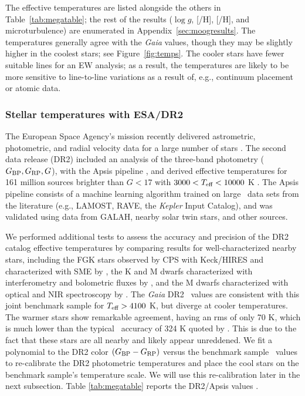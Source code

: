 The \moog effective temperatures are listed alongside the others in Table~\ref{tab:megatable}; the rest of the \moog results ($\log g$, [/H], [/H], and microturbulence) are enumerated in Appendix~\ref{sec:moogresults}.  The temperatures generally agree with the {\it Gaia} values, though they may be slightly higher in the coolest stars; see Figure~\ref{fig:temps}.  The cooler stars have fewer suitable  lines for an EW analysis; as a result, the temperatures are likely to be more sensitive to line-to-line variations as a result of, e.g., continuum placement or atomic data.


\subsubsection{Stellar temperatures with ESA/\gaia DR2} 
\label{sec:dr2}
The European Space Agency's \gaia mission recently delivered 
astrometric, photometric, and radial velocity data for 
a large number of stars \citep{GaiaDR2}. 
The second data release (DR2) included an analysis of the three-band photometry ($G_{\rm BP}, G_{\rm RP}, G$), 
with the Apsis pipeline \citep{apsis2013}, 
and derived effective temperatures for 161 million sources brighter than $G<17$ 
with $3000 < T_{\mbox{\scriptsize eff}} < 10000$ K \citep{DR2prop}. 
The Apsis pipeline consists of a machine learning algorithm trained on 
large \teff\ data sets from the literature (e.g., LAMOST, RAVE, the \textit{Kepler} Input Catalog), 
and was validated using 
data from GALAH, nearby solar twin stars, and other sources.

We performed additional tests to assess the accuracy and 
precision of the DR2 catalog effective temperatures by comparing results 
for well-characterized nearby stars, 
including the FGK stars observed by CPS with Keck/HIRES and characterized with SME by \citet{Brewer2016}, 
the K and M dwarfs characterized with interferometry and bolometric fluxes by 
\citet{boyajian2012}, 
and the M dwarfs characterized with optical and NIR spectroscopy by \citet{Mann2015}.
The \textit{Gaia} DR2 \teff\ values are consistent with this joint benchmark sample
for $T_{\mbox{\scriptsize eff}} > 4100$ K, but diverge at cooler temperatures.
The warmer stars show remarkable agreement, having an rms of only 70 K, which is 
much lower than the typical \teff\ accuracy of 324 K quoted by \citet{DR2prop}.
This is due to the fact that these stars are all nearby and likely appear unreddened.
We fit a polynomial to the DR2 color $(G_{\rm BP} - G_{\rm RP})$ versus 
the benchmark sample \teff\ values to re-calibrate the DR2 photometric temperatures 
and place the cool stars on the benchmark sample's temperature scale.
We will use this re-calibration later in the next subsection.
Table \ref{tab:megatable} reports the DR2/Apsis values \citep{DR2prop}. 

